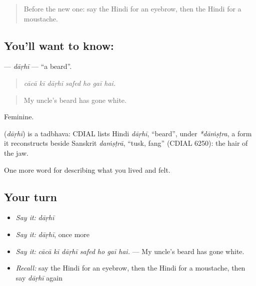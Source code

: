 \label{lesson:HI-C476-darhi}



\begin{quote}
Before the new one: say the Hindi for an eyebrow, then the Hindi for a moustache.
\end{quote}

\subsection*{You'll want to know: }
\textbf{} — \emph{dāṛhī} — \textquotedblleft{}a beard\textquotedblright{}.

\begin{quote}
      
\end{quote}

\begin{quote}
\emph{cācā kī dāṛhī safed ho gaī hai.}
\end{quote}

\begin{quote}
My uncle's beard has gone white.
\end{quote}

Feminine.

\begin{cousinweb}
\textbf{} (\emph{dāṛhī}) is a tadbhava: CDIAL lists Hindi \emph{dāṛhī}, \textquotedblleft{}beard\textquotedblright{}, under \emph{*dāṁṣṭra}, a form it reconstructs beside Sanskrit \emph{daṁṣṭrā}, \textquotedblleft{}tusk, fang\textquotedblright{} (CDIAL 6250): the hair of the jaw.
\end{cousinweb}

\begin{grammarlens}[title={What you've built}]
One more word for describing what you lived and felt.
\end{grammarlens}

\subsection*{Your turn}
\begin{itemize}
\raggedright
  \item \emph{Say it:} \emph{dāṛhī}
  \item \emph{Say it:} \emph{dāṛhī}, once more
  \item \emph{Say it:} \emph{cācā kī dāṛhī safed ho gaī hai.} — My uncle's beard has gone white.
  \item \emph{Recall:} say the Hindi for an eyebrow, then the Hindi for a moustache, then say \emph{dāṛhī} again
\end{itemize}

